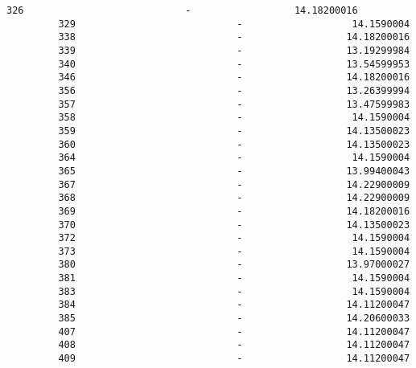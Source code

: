 \documentclass[11pt]{article}
\begin{document}
\begin{Verbatim}[commandchars=\\\{\}]
         326                            -                  14.18200016   
         329                            -                   14.1590004   
         338                            -                  14.18200016   
         339                            -                  13.19299984   
         340                            -                  13.54599953   
         346                            -                  14.18200016   
         356                            -                  13.26399994   
         357                            -                  13.47599983   
         358                            -                   14.1590004   
         359                            -                  14.13500023   
         360                            -                  14.13500023   
         364                            -                   14.1590004   
         365                            -                  13.99400043   
         367                            -                  14.22900009   
         368                            -                  14.22900009   
         369                            -                  14.18200016   
         370                            -                  14.13500023   
         372                            -                   14.1590004   
         373                            -                   14.1590004   
         380                            -                  13.97000027   
         381                            -                   14.1590004   
         383                            -                   14.1590004   
         384                            -                  14.11200047   
         385                            -                  14.20600033   
         407                            -                  14.11200047   
         408                            -                  14.11200047   
         409                            -                  14.11200047   
         

\end{Verbatim}
\end{document}
